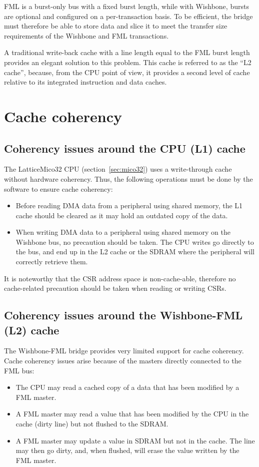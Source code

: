 \documentclass[a4paper,11pt]{kthesis}
\begin{document}
FML is a burst-only bus with a fixed burst length, while with Wishbone, bursts are optional and configured on a per-transaction basis. To be efficient, the bridge must therefore be able to store data and slice it to meet the transfer size requirements of the Wishbone and FML transactions.

A traditional write-back cache with a line length equal to the FML burst length provides an elegant solution to this problem. This cache is referred to as the ``L2 cache'', because, from the CPU point of view, it provides a second level of cache relative to its integrated instruction and data caches.

\section{Cache coherency}
\label{sec:coherency}
\subsection{Coherency issues around the CPU (L1) cache}
The LatticeMico32 CPU (section~\ref{sec:mico32}) uses a write-through cache without hardware coherency. Thus, the following operations must be done by the software to ensure cache coherency:
\begin{itemize}
\item Before reading DMA data from a peripheral using shared memory, the L1 cache should be cleared as it may hold an outdated copy of the data.
\item When writing DMA data to a peripheral using shared memory on the Wishbone bus, no precaution should be taken. The CPU writes go directly to the bus, and end up in the L2 cache or the SDRAM where the peripheral will correctly retrieve them.
\end{itemize}

It is noteworthy that the CSR address space is non-cache-able, therefore no cache-related precaution should be taken when reading or writing CSRs.

\subsection{Coherency issues around the Wishbone-FML (L2) cache}
The Wishbone-FML bridge provides very limited support for cache coherency. Cache coherency issues arise because of the masters directly connected to the FML bus:
\begin{itemize}
\item The CPU may read a cached copy of a data that has been modified by a FML master.
\item A FML master may read a value that has been modified by the CPU in the cache (dirty line) but not flushed to the SDRAM.
\item A FML master may update a value in SDRAM but not in the cache. The line may then go dirty, and, when flushed, will erase the value written by the FML master.
\end{itemize}
\end{document}

